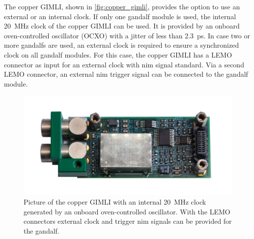 The copper GIMLI, shown in \autoref{fig:copper_gimli}, provides the option to use an external or an internal clock.
If only one \ac{gandalf} module is used, the internal \SI{20}{\mega\hertz} clock of the copper GIMLI can be used.
It is provided by an onboard oven-controlled oscillator (OCXO) with a jitter of less than \SI{2.3}{\pico\second}.
In case two or more \ac{gandalf}s are used, an external clock is required to ensure a synchronized clock on all \ac{gandalf} modules.
For this case, the copper GIMLI has a LEMO connector as input for an external clock with \ac{nim} signal standard.
Via a second LEMO connector, an external \ac{nim} trigger signal can be connected to the \ac{gandalf} module.

\begin{figure}
	\centering
	\includegraphics[width=.5\textwidth]{pictures/copper_gimli.png}
	\caption[Copper GIMLI]{Picture of the copper GIMLI with an internal \SI{20}{\mega\hertz} clock generated by an onboard oven-controlled oscillator. With the LEMO connectors external clock and trigger \ac{nim} signals can be provided for the \ac{gandalf}. \cite{herrmann}}
	\label{fig:copper_gimli}
\end{figure}



